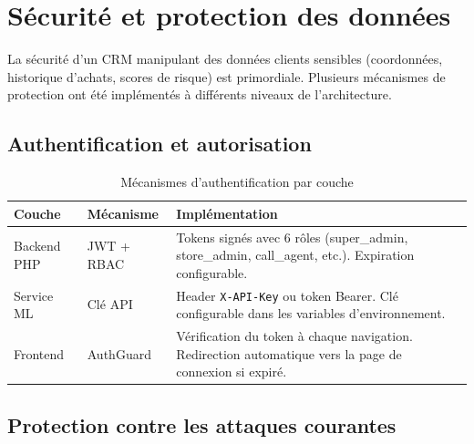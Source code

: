 \documentclass[12pt,a4paper]{report}
\begin{document}
\section{S\'{e}curit\'{e} et protection des donn\'{e}es}

La s\'{e}curit\'{e} d'un CRM manipulant des donn\'{e}es clients sensibles (coordonn\'{e}es, historique d'achats, scores de risque) est primordiale. Plusieurs m\'{e}canismes de protection ont \'{e}t\'{e} impl\'{e}ment\'{e}s \`{a} diff\'{e}rents niveaux de l'architecture.

\subsection{Authentification et autorisation}

\begin{table}[H]
\centering
\caption{M\'{e}canismes d'authentification par couche}
\label{tab:security_auth}
\begin{tabularx}{\textwidth}{l l X}
\toprule
\textbf{Couche} & \textbf{M\'{e}canisme} & \textbf{Impl\'{e}mentation} \\
\midrule
Backend PHP & JWT + RBAC & Tokens sign\'{e}s avec 6 r\^{o}les (super\_admin, store\_admin, call\_agent, etc.). Expiration configurable. \\
Service ML & Cl\'{e} API & Header \texttt{X-API-Key} ou token Bearer. Cl\'{e} configurable dans les variables d'environnement. \\
Frontend & AuthGuard & V\'{e}rification du token \`{a} chaque navigation. Redirection automatique vers la page de connexion si expir\'{e}. \\
\bottomrule
\end{tabularx}
\end{table}

\subsection{Protection contre les attaques courantes}
\end{document}
